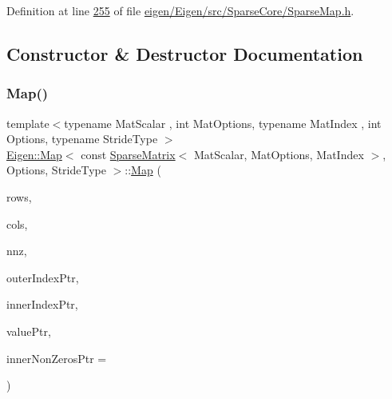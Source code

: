 Definition at line \hyperlink{eigen_2_eigen_2src_2_sparse_core_2_sparse_map_8h_source_l00255}{255} of file \hyperlink{eigen_2_eigen_2src_2_sparse_core_2_sparse_map_8h_source}{eigen/\+Eigen/src/\+Sparse\+Core/\+Sparse\+Map.\+h}.



\subsection{Constructor \& Destructor Documentation}
\mbox{\label{class_eigen_1_1_map_3_01const_01_sparse_matrix_3_01_mat_scalar_00_01_mat_options_00_01_mat_index4032bba20cf92aab8bcf07e926e15a4f_a8075e61ba51d1aa5858b0163e80eca8b}} 
\subsubsection{\texorpdfstring{Map()}{Map()}\hspace{0.1cm}{\footnotesize\ttfamily [1/2]}}
{\footnotesize\ttfamily template$<$typename Mat\+Scalar , int Mat\+Options, typename Mat\+Index , int Options, typename Stride\+Type $>$ \\
\hyperlink{group___core___module_class_eigen_1_1_map}{Eigen\+::\+Map}$<$ const \hyperlink{group___sparse_core___module_class_eigen_1_1_sparse_matrix}{Sparse\+Matrix}$<$ Mat\+Scalar, Mat\+Options, Mat\+Index $>$, Options, Stride\+Type $>$\+::\hyperlink{group___core___module_class_eigen_1_1_map}{Map} (\begin{DoxyParamCaption}\item[{\hyperlink{namespace_eigen_a62e77e0933482dafde8fe197d9a2cfde}{Index}}]{rows,  }\item[{\hyperlink{namespace_eigen_a62e77e0933482dafde8fe197d9a2cfde}{Index}}]{cols,  }\item[{\hyperlink{namespace_eigen_a62e77e0933482dafde8fe197d9a2cfde}{Index}}]{nnz,  }\item[{const Storage\+Index $\ast$}]{outer\+Index\+Ptr,  }\item[{const Storage\+Index $\ast$}]{inner\+Index\+Ptr,  }\item[{const Scalar $\ast$}]{value\+Ptr,  }\item[{const Storage\+Index $\ast$}]{inner\+Non\+Zeros\+Ptr = {} }\end{DoxyParamCaption})\hspace{0.3cm}{\ttfamily [inline]}}

